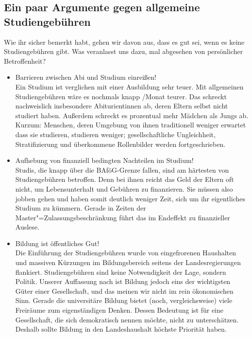 \subsection{Ein paar Argumente gegen allgemeine \\Studiengebühren}
Wie ihr sicher bemerkt habt, gehen wir davon aus, dass es gut sei, wenn es keine Studiengebühren gibt. Was veranlasst uns dazu, mal abgesehen von persönlicher Betroffenheit?
\begin{itemize}
\item {Barrieren zwischen Abi und Studium einreißen!}\\
	Ein Studium ist verglichen mit einer Ausbildung sehr teuer. Mit allgemeinen Studiengebühren wäre es nochmals knapp /Monat teurer. Das schreckt nachweislich insbesondere Abiturientinnen ab, deren Eltern selbst nicht studiert haben. Außerdem schreckt es prozentual mehr Mädchen als Jungs ab. Kurzum: Menschen, deren Umgebung von ihnen traditionell weniger erwartet dass sie studieren, studieren weniger; gesellschaftliche Ungleichheit, Stratifizierung und überkommene Rollenbilder werden fortgeschrieben.
\item {Aufhebung von finanziell bedingten Nachteilen im Studium!}\\
	Studis, die knapp über die BAföG-Grenze fallen, sind am härtesten von Studiengebühren betroffen. Denn bei ihnen reicht das Geld der Eltern oft nicht, um Lebensunterhalt und Gebühren zu finanzieren. Sie müssen also jobben gehen und haben somit deutlich weniger Zeit, sich um ihr eigentliches Studium zu kümmern. Gerade in Zeiten der Master"=Zulassungsbeschränkung führt das im Endeffekt zu finanzieller Auslese.
\item {Bildung ist öffentliches Gut!}\\
	Die Einführung der Studiengebühren wurde von eingefrorenen Haushalten und massiven Kürzungen im Bildungsbereich seitens der Landesregierungen flankiert. Studiengebühren sind keine Notwendigkeit der Lage, sondern Politik. Unserer Auffassung nach ist Bildung jedoch eins der wichtigsten Güter einer Gesellschaft, und das meinen wir nicht im rein ökonomischen Sinn. Gerade die universitäre Bildung bietet (noch, vergleichsweise) viele Freiräume zum eigenständigen Denken. Dessen Bedeutung ist für eine Gesellschaft, die sich demokratisch nennen möchte, nicht zu unterschätzen. Deshalb sollte Bildung in den Landeshaushalt höchste Priorität haben.
\end{itemize}

